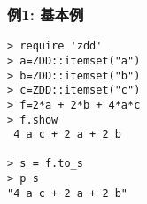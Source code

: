 \subsubsection*{例1: 基本例}



\begin{Verbatim}[baselinestretch=0.7,frame=single]
> require 'zdd'
> a=ZDD::itemset("a")
> b=ZDD::itemset("b")
> c=ZDD::itemset("c")
> f=2*a + 2*b + 4*a*c
> f.show
 4 a c + 2 a + 2 b

> s = f.to_s
> p s
"4 a c + 2 a + 2 b"
\end{Verbatim}
